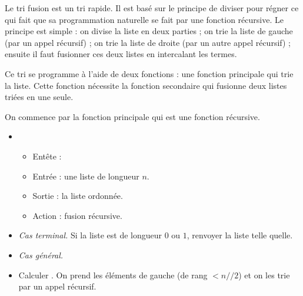 \documentclass[11pt,class=report,crop=false]{standalone}
\begin{document}

\begin{activite}
	
	
	
	Le tri fusion est un tri rapide. Il est basé sur le principe de \og{}diviser pour régner\fg{} ce qui fait que sa programmation naturelle se fait
	par une fonction récursive. Le principe est simple : on divise la liste en deux parties ; on trie la liste de gauche (par un appel récursif) ; on trie la liste de droite (par un autre appel récursif) ; ensuite il faut fusionner ces deux listes en intercalant les termes.
	
	
	Ce tri se programme à l'aide de deux fonctions : une fonction principale  qui trie la liste. Cette fonction nécessite la fonction secondaire  qui fusionne deux listes triées en une seule. 
	
	\bigskip 
	
	On commence par la fonction principale qui est une fonction récursive.
	\begin{algorithme}
	\sauteligne 
	
	\begin{itemize}
		\item 
		\begin{itemize}
			\item Entête :  
			\item Entrée : une liste de longueur $n$.			
			\item Sortie : la liste ordonnée.		
			\item Action : fusion récursive.		
		\end{itemize}
		
		\item \emph{Cas terminal.} Si la liste est de longueur $0$ ou $1$, renvoyer la liste telle quelle.
		
		\item \emph{Cas général.} 
		
		\item Calculer . On prend les éléments de gauche (de rang $< n//2$) et on les trie par un appel récursif.
		

\end{itemize}
\end{algorithme}
\end{activite}
\end{document}
